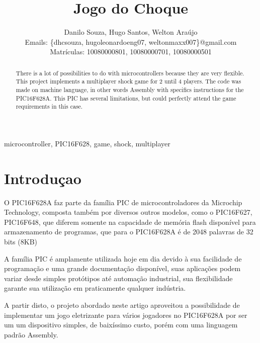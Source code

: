 \documentclass[article]{IEEEtran}
\begin{document}
\title{Jogo do Choque}

\author{Danilo Souza, Hugo Santos, Welton Ara\'ujo

Emails: \{dhcsouza, hugoleonardoeng07, weltonmaxx007\}@gmail.com\\
Matr\'iculas: 10080000801, 10080000701, 10080000501}

\maketitle

\begin{abstract}
There is a lot of possibilities to do with microcontrollers because they are very flexible. This project implements a multiplayer shock game for 2 until 4 players. The code was made on machine language, in other words Assembly with specifics instructions for the PIC16F628A. This PIC has several limitations, but could perfectly attend the game requirements in this case.
\end{abstract}

\begin{IEEEkeywords}
microcontroller, PIC16F628, game, shock, multiplayer
\end{IEEEkeywords}

\IEEEpeerreviewmaketitle


\section{Introduçao}
O PIC16F628A faz parte da família PIC de microcontroladores da Microchip Technology, composta também por diversos outros modelos, como o PIC16F627, PIC16F648, que diferem somente na	capacidade de memória flash disponível para armazenamento de programas, que para o PIC16F628A é de 2048 palavras de 32 bits (8KB)

A família PIC é amplamente utilizada hoje em dia devido à sua facilidade de programação e uma grande documentação disponível, suas aplicações podem variar desde simples protótipos até automação industrial, sua flexibilidade garante sua utilização em praticamente qualquer indústria.

A partir disto, o projeto abordado neste artigo aproveitou a possibilidade de implementar um jogo eletrizante para vários jogadores no PIC16F628A por ser um um dispositivo simples, de baixíssimo custo, porém com uma linguagem padrão Assembly.
\end{document}
